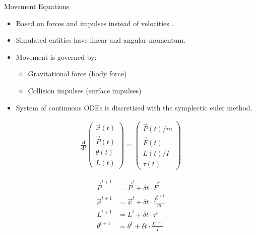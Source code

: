 \begin{frame}{Movement Equations}
    \begin{itemize}
        \item Based on forces and impulses instead of velocities \cite{baraff}.
        \item Simulated entities have linear and angular momentum.
        \item Movement is governed by:
        \begin{itemize}
            \item Gravitational force (body force)
            \item Collision impulses (surface impulses)
        \end{itemize}
        \item System of continuous ODEs is discretized with the symplectic euler method.
    \end{itemize}
    \begin{minipage}{\textwidth}
        \centering
        \begin{minipage}{.495\textwidth}
            \begin{align*}
                \frac{\textbf{d}}{\textbf{d}{t}} 
                \left(
                  \begin{array}{c}
                    \overrightarrow{x}(t)\\
                    \overrightarrow{P}(t)\\
                    \theta(t)\\
                    L(t)
                  \end{array}
                \right)
                =
                \left(
                  \begin{array}{c}
                    {\overrightarrow{P}(t)}/{m}\\
                    \overrightarrow{F}(t)\\
                    L(t)/I\\
                    \tau(t)
                  \end{array}
                \right)
            \end{align*}
        \end{minipage}
        \begin{minipage}{.495\textwidth}
            \begin{align*}
                \overrightarrow{P}^{t+1} &= \overrightarrow{P}^{t} + \delta t \cdot \overrightarrow{F}^{t}\\
                \overrightarrow{x}^{t+1} &= \overrightarrow{x}^{t} + \delta t \cdot \frac{\overrightarrow{P}^{t+1}}{m}\\
                L^{t+1} &= L^{t} + \delta t \cdot \tau^{t}\\
                \theta^{t+1} &= \theta^{t} + \delta t \cdot \frac{L^{t+1}}{I}
              \end{align*}
        \end{minipage}
    \end{minipage}
\end{frame}

